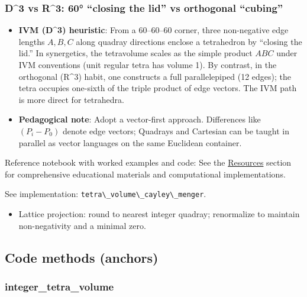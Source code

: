 \documentclass[
  10pt,
]{article}
\newcommand{\passthrough}[1]{#1}
\providecommand{\tightlist}{%
  \setlength{\itemsep}{0pt}\setlength{\parskip}{0pt}}
\renewcommand{\texttt}[1]{%
    \colorbox{codebg}{\color{codefg}\ttfamily #1}%
}
\begin{document}
\hypertarget{d3-vs-r3-60-closing-the-lid-vs-orthogonal-cubing}{%
\subsubsection{D\^{}3 vs R\^{}3: 60° ``closing the lid'' vs orthogonal
``cubing''}\label{d3-vs-r3-60-closing-the-lid-vs-orthogonal-cubing}}

\begin{itemize}
\tightlist
\item
  \textbf{IVM (D\^{}3) heuristic}: From a 60--60--60 corner, three
  non-negative edge lengths \(A,B,C\) along quadray directions enclose a
  tetrahedron by ``closing the lid.'' In synergetics, the tetravolume
  scales as the simple product \(ABC\) under IVM conventions (unit
  regular tetra has volume 1). By contrast, in the orthogonal (R\^{}3)
  habit, one constructs a full parallelepiped (12 edges); the tetra
  occupies one-sixth of the triple product of edge vectors. The IVM path
  is more direct for tetrahedra.
\item
  \textbf{Pedagogical note}: Adopt a vector-first approach. Differences
  like \((P_i-P_0)\) denote edge vectors; Quadrays and Cartesian can be
  taught in parallel as vector languages on the same Euclidean
  container.
\end{itemize}

Reference notebook with worked examples and code: See the
\href{07_resources.md}{Resources} section for comprehensive educational
materials and computational implementations.

See implementation:
\passthrough{\lstinline!tetra\_volume\_cayley\_menger!}.

\begin{itemize}
\tightlist
\item
  Lattice projection: round to nearest integer quadray; renormalize to
  maintain non-negativity and a minimal zero.
\end{itemize}

\hypertarget{code-methods-anchors}{%
\subsection{Code methods (anchors)}\label{code-methods-anchors}}

\hypertarget{code:integer_tetra_volume}{%
\subsubsection{\texorpdfstring{\texttt{integer\_tetra\_volume}}{integer\_tetra\_volume}}\label{code:integer_tetra_volume}}
\end{document}
